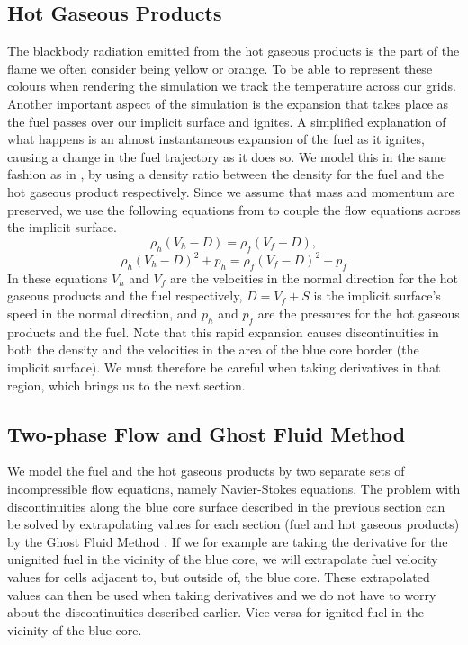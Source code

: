 \subsection{Hot Gaseous Products}
The blackbody radiation emitted from the hot gaseous products is the part of the flame we often consider being yellow or orange. To be able to represent these colours when rendering the simulation we track the temperature across our grids. Another important aspect of the simulation is the expansion that takes place as the fuel passes over our implicit surface and ignites. A simplified explanation of what happens is an almost instantaneous expansion of the fuel as it ignites, causing a change in the fuel trajectory as it does so. We model this in the same fashion as in \cite{Nguyen02}, by using a density ratio between the density for the fuel and the hot gaseous product respectively. Since we assume that mass and momentum are preserved, we use the following equations from \cite{Nguyen02} to couple the flow equations across the implicit surface.
\begin{equation}
\rho_h(V_h-D) = \rho_f(V_f-D),
\end{equation}
\begin{equation}
\rho_h(V_h-D)^2+p_h = \rho_f(V_f-D)^2+p_f
\end{equation}
In these equations $V_h$ and $V_f$ are the velocities in the normal direction for the hot gaseous products and the fuel respectively, $D = V_f+S$ is the implicit surface's speed in the normal direction, and $p_h$ and $p_f$ are the pressures for the hot gaseous products and the fuel. Note that this rapid expansion causes discontinuities in both the density and the velocities in the area of the blue core border (the implicit surface). We must therefore be careful when taking derivatives in that region, which brings us to the next section.
\subsection{Two-phase Flow and Ghost Fluid Method}
We model the fuel and the hot gaseous products by two separate sets of incompressible flow equations, namely Navier-Stokes equations. The problem with discontinuities along the blue core surface described in the previous section can be solved by extrapolating values for each section (fuel and hot gaseous products) by the Ghost Fluid Method \cite{Ghost}. If we  for example are taking the derivative for the unignited fuel in the vicinity of the blue core, we will extrapolate fuel velocity values for cells adjacent to, but outside of, the blue core. These extrapolated values can then be used when taking derivatives and we do not have to worry about the discontinuities described earlier. Vice versa for ignited fuel in the vicinity of the blue core.